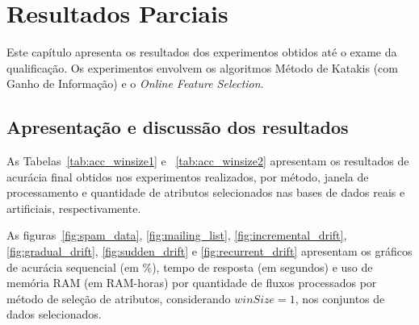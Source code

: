 \chapter{Resultados Parciais}\label{chp:resultados}

Este capítulo apresenta os resultados dos experimentos obtidos até o exame da qualificação. Os experimentos envolvem os algoritmos Método de Katakis (com Ganho de Informação) e o \textit{Online Feature Selection}.

\section{Apresentação e discussão dos resultados}

As Tabelas~\ref{tab:acc_winsize1} e ~\ref{tab:acc_winsize2} apresentam os resultados de acurácia final obtidos nos experimentos realizados, por método, janela de processamento e quantidade de atributos selecionados nas bases de dados reais e artificiais, respectivamente. 

As figuras~\ref{fig:spam_data}, \ref{fig:mailing_list}, \ref{fig:incremental_drift}, \ref{fig:gradual_drift}, \ref{fig:sudden_drift} e \ref{fig:recurrent_drift} apresentam os gráficos de acurácia sequencial (em \%), tempo de resposta (em segundos) e uso de memória RAM (em RAM-horas) por quantidade de fluxos processados por método de seleção de atributos, considerando $winSize=1$, nos conjuntos de dados selecionados.


